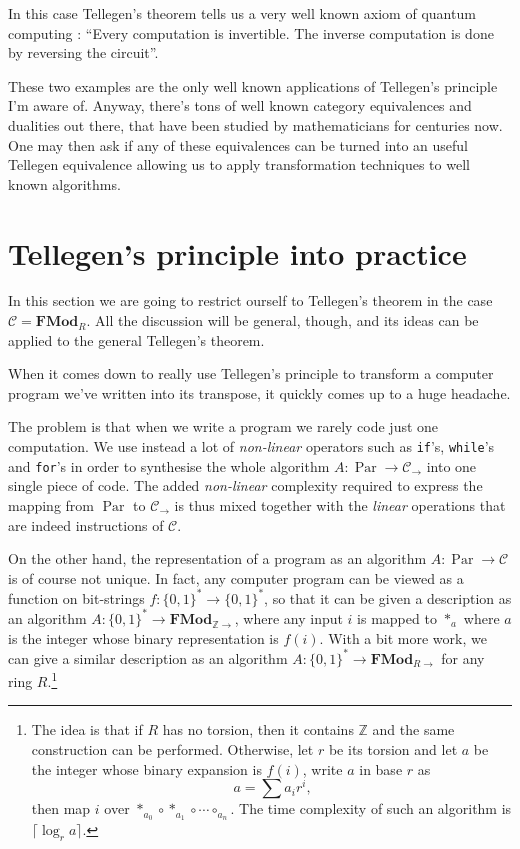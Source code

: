 \documentclass{article}
\newcommand{\cat}[1]{\mathscr{#1}}
\newcommand{\lcat}[1]{\mathbf{#1}}
\newcommand{\C}{\cat{C}}
\newcommand{\comp}{\circ}
\newcommand{\Z}{\mathbb{Z}}
\newcommand{\ra}{\rightarrow}
\DeclareMathOperator{\Par}{Par}
\begin{document}
  In this case Tellegen's theorem tells us a very well known axiom of
  quantum computing : ``Every computation is invertible. The inverse
  computation is done by reversing the circuit''.

  These two examples are the only well known applications of
  Tellegen's principle I'm aware of. Anyway, there's tons of well
  known category equivalences and dualities out there, that have been
  studied by mathematicians for centuries now. One may then ask if any
  of these equivalences can be turned into an useful Tellegen
  equivalence allowing us to apply transformation techniques to well
  known algorithms.
  

  \section{Tellegen's principle into practice}
  \label{sec:practice}
  In this section we are going to restrict ourself to Tellegen's
  theorem in the case $\C = \lcat{FMod}_R$. All the discussion will be
  general, though, and its ideas can be applied to the general
  Tellegen's theorem.

  When it comes down to really use Tellegen's principle to transform a
  computer program we've written into its transpose, it quickly comes
  up to a huge headache.

  The problem is that when we write a program we rarely code just one
  computation. We use instead a lot of \emph{non-linear} operators
  such as \verb|if|'s, \verb|while|'s and \verb|for|'s in order to
  synthesise the whole algorithm $A:\Par\ra\C_\ra$ into one single
  piece of code. The added \emph{non-linear} complexity required to
  express the mapping from $\Par$ to $\C_\ra$ is thus mixed together
  with the \emph{linear} operations that are indeed instructions of
  $\C$.

  On the other hand, the representation of a program as an algorithm
  $A:\Par\ra\C$ is of course not unique. In fact, any computer program
  can be viewed as a function on bit-strings
  $f:\{0,1\}^\ast\ra\{0,1\}^\ast$, so that it can be given a
  description as an algorithm $A:\{0,1\}^\ast\ra\lcat{FMod}_{\Z\ra}$,
  where any input $i$ is mapped to $*_a$ where $a$ is the integer
  whose binary representation is $f(i)$. With a bit more work, we can
  give a similar description as an algorithm
  $A:\{0,1\}^\ast\ra\lcat{FMod}_{R\ra}$ for any ring $R$.\footnote{The
    idea is that if $R$ has no torsion, then it contains $\Z$ and the
    same construction can be performed. Otherwise, let $r$ be its
    torsion and let $a$ be the integer whose binary expansion is
    $f(i)$, write $a$ in base $r$ as \[a = \sum a_ir^i\text{,}\] then
    map $i$ over $*_{a_0}\comp*_{a_1}\comp\cdots\comp_{a_n}$. The time
    complexity of such an algorithm is $\lceil\log_ra\rceil$.}
\end{document}
